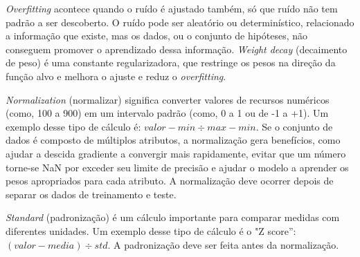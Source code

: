 \textit{Overfitting} acontece quando o ruído é ajustado também, só que ruído não tem padrão a ser descoberto. O ruído pode ser aleatório ou determinístico, relacionado a informação que existe, mas os dados, ou o conjunto de hipóteses, não conseguem promover o aprendizado dessa informação. \textit{Weight decay} (decaimento de peso) é uma constante regularizadora, que restringe os pesos na direção da função alvo e melhora o ajuste e reduz o \textit{overfitting}.

\textit{Normalization} (normalizar) significa converter valores de recursos numéricos (como, 100 a 900) em um intervalo padrão (como, 0 a 1 ou de -1 a +1). Um exemplo desse tipo de cálculo é: $valor - min \div max - min$. Se o conjunto de dados é composto de múltiplos atributos, a normalização gera benefícios, como ajudar a descida gradiente a convergir mais rapidamente, evitar que um número torne-se NaN por exceder seu limite de precisão e ajudar o modelo a aprender os pesos apropriados para cada atributo. A normalização deve ocorrer depois de separar os dados de treinamento e teste.

\textit{Standard} (padronização) é um cálculo importante para comparar medidas com diferentes unidades. Um exemplo desse tipo de cálculo é o "Z score”: $(valor - media) \div std$. A padronização deve ser feita antes da normalização.

